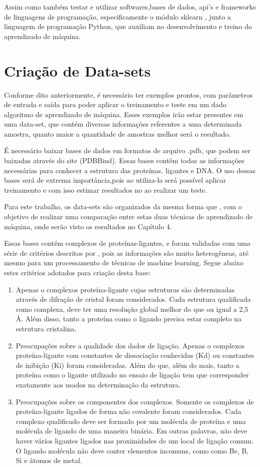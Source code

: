 \documentclass[tcc, capa]{texucpel}
\begin{document}
Assim como também testar e utilizar softwares,bases de dados, api's e frameworks de linguagens de programação, especificamente o módulo sklearn \cite{scikit-learn}, junto a linguagem de programação Python, que auxiliam no desenvolvimento e treino do aprendizado de máquina.

\section{Criação de Data-sets}
Conforme dito anteriormente, é necessário ter exemplos prontos, com parâmetros de entrada e saída para poder aplicar o treinamento e teste em um dado algoritmo de aprendizado de máquina.
Esses exemplos irão estar presentes em uma data-set, que contém diversas informações referentes a uma determinada amostra, quanto maior a quantidade de amostras melhor será o resultado.

É necessário baixar bases de dados em formatos de arquivo .pdb, que podem ser baixadas através do site (PDBBind). Essas bases contêm todas as informações necessárias para conhecer a estrutura das proteínas, ligantes e DNA. 
O uso dessas bases será de extrema importância,pois ao utiliza-la será possível aplicar treinamento e com isso estimar resultados no ao realizar um teste. 

Para este trabalho, os data-sets são organizados da mesma forma que \cite{ballester2010machine}, com o objetivo de realizar uma comparação entre estas duas técnicas de aprendizado de máquina, onde serão visto os resultados no Capítulo 4.

Essas bases contém complexos de proteínas-ligantes, e foram validadas com uma série de critérios descritos por \cite{cheng2009comparative}, pois as informações são muito heterogêneas, até mesmo para um processamento de técnicas de machine learning. 
Segue abaixo estes critérios adotados para criação desta base:

\begin{enumerate}
\item Apenas o complexos proteína-ligante cujas estruturas são determinadas através de difração de cristal foram considerados. Cada estrutura qualificada como complexa, deve ter uma resolução global melhor do que ou igual a 2,5 Å. Além disso, tanto a proteína como o ligando precisa estar completo na estrutura cristalina.
\item Preocupações sobre a qualidade dos dados de ligação. Apenas o complexos proteína-ligante com constantes de dissociação conhecidas (Kd) ou constantes de inibição (Ki) foram consideradas. Além do que, além do mais, tanto a proteína como o ligante utilizado no ensaio de ligação tem que corresponder exatamente aos usados na determinação da estrutura.
\item Preocupações sobre os componentes dos complexos. Somente os complexos de proteína-ligante ligados de forma não covalente foram considerados. Cada complexo qualificado deve ser formado por um molécula de proteína e uma molécula de ligando de uma maneira binária. Em outras palavras, não deve haver vários ligantes ligados nas proximidades de um local de ligação comum. O ligando molécula não deve conter elementos incomuns, como como Be, B, Si e átomos de metal.
\end{enumerate}
\end{document}
